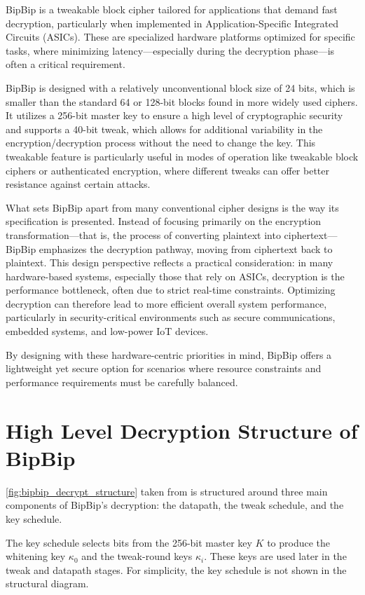 BipBip is a tweakable block cipher tailored for applications that demand fast decryption, particularly when implemented in Application-Specific Integrated Circuits (ASICs). These are specialized hardware platforms optimized for specific tasks, where minimizing latency—especially during the decryption phase—is often a critical requirement.

BipBip is designed with a relatively unconventional block size of 24 bits, which is smaller than the standard 64 or 128-bit blocks found in more widely used ciphers. It utilizes a 256-bit master key to ensure a high level of cryptographic security and supports a 40-bit tweak, which allows for additional variability in the encryption/decryption process without the need to change the key. This tweakable feature is particularly useful in modes of operation like tweakable block ciphers or authenticated encryption, where different tweaks can offer better resistance against certain attacks.

What sets BipBip apart from many conventional cipher designs is the way its specification is presented. Instead of focusing primarily on the encryption transformation—that is, the process of converting plaintext into ciphertext—BipBip emphasizes the decryption pathway, moving from ciphertext back to plaintext. This design perspective reflects a practical consideration: in many hardware-based systems, especially those that rely on ASICs, decryption is the performance bottleneck, often due to strict real-time constraints. Optimizing decryption can therefore lead to more efficient overall system performance, particularly in security-critical environments such as secure communications, embedded systems, and low-power IoT devices.

By designing with these hardware-centric priorities in mind, BipBip offers a lightweight yet secure option for scenarios where resource constraints and performance requirements must be carefully balanced.

\section{High Level Decryption Structure of BipBip}

\ref{fig:bipbip_decrypt_structure} taken from \cite{Belkheyar_Daemen_Dobraunig_Ghosh_Rasoolzadeh_2022} is structured around three main components of BipBip's decryption: the datapath, the tweak schedule, and the key schedule.

The key schedule selects bits from the 256-bit master key $K$ to produce the whitening key $\kappa_0$ and the tweak-round keys $\kappa_i$. These keys are used later in the tweak and datapath stages. For simplicity, the key schedule is not shown in the structural diagram.

